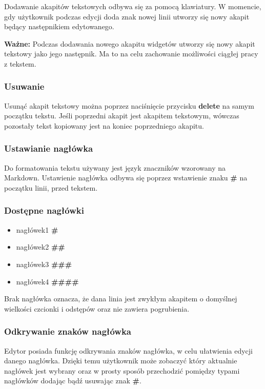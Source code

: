 Dodawanie akapitów tekstowych odbywa się za pomocą klawiatury. W momencie, gdy użytkownik podczas edycji doda znak nowej linii utworzy się nowy akapit będący następnikiem edytowanego.

\textbf{Ważne:} Podczas dodawania nowego akapitu widgetów utworzy się nowy akapit tekstowy jako jego następnik. Ma to na celu zachowanie możliwości ciągłej pracy z tekstem.

\subsubsection{Usuwanie}

Usunąć akapit tekstowy można poprzez naciśnięcie przycisku \textbf{delete} na samym początku tekstu. Jeśli poprzedni akapit jest akapitem tekstowym, wówczas pozostały tekst kopiowany jest na koniec poprzedniego akapitu.

\subsubsection{Ustawianie nagłówka}

Do formatowania tekstu używany jest język znaczników wzorowany na Markdown. Ustawienie nagłówka odbywa się poprzez wstawienie znaku \textbf{\#} na początku linii, przed tekstem.

\subsubsection{Dostępne nagłówki}
\begin{itemize}
    \setlength\itemsep{0mm}
    \item nagłówek1 \textbf{\#}
    \item nagłówek2 \textbf{\#\#}
    \item nagłówek3 \textbf{\#\#\#}
    \item nagłówek4 \textbf{\#\#\#\#}
\end{itemize}

Brak nagłówka oznacza, że dana linia jest zwykłym akapitem o domyślnej wielkości czcionki i odstępów oraz nie zawiera pogrubienia.

\pagebreak

\subsubsection{Odkrywanie znaków nagłówka}

Edytor posiada funkcję odkrywania znaków nagłówka, w celu ułatwienia edycji danego nagłówka. Dzięki temu użytkownik może zobaczyć który aktualnie nagłówek jest wybrany oraz w prosty sposób przechodzić pomiędzy typami nagłówków dodając bądź usuwając znak \textbf{\#}.

